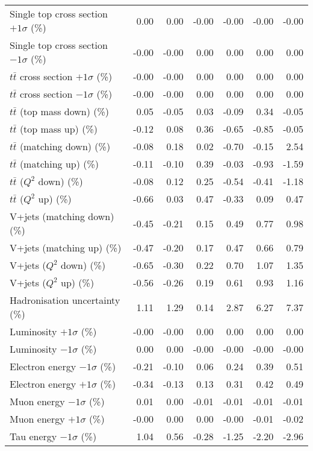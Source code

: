\begin{table}[htbp]
{\begin{tabular}{lrrrrrr}
Single top cross section $+1\sigma$ (\%) & 0.00 & 0.00 & -0.00 & -0.00 & -0.00 & -0.00 \\ 
Single top cross section $-1\sigma$ (\%) & -0.00 & -0.00 & 0.00 & 0.00 & 0.00 & 0.00 \\ 
$t\bar{t}$ cross section $+1\sigma$ (\%) & -0.00 & -0.00 & 0.00 & 0.00 & 0.00 & 0.00 \\ 
$t\bar{t}$ cross section $-1\sigma$ (\%) & -0.00 & -0.00 & 0.00 & 0.00 & 0.00 & 0.00 \\ 
$t\bar{t}$ (top mass down) (\%) & 0.05 & -0.05 & 0.03 & -0.09 & 0.34 & -0.05 \\ 
$t\bar{t}$ (top mass up) (\%) & -0.12 & 0.08 & 0.36 & -0.65 & -0.85 & -0.05 \\ 
$t\bar{t}$ (matching down) (\%) & -0.08 & 0.18 & 0.02 & -0.70 & -0.15 & 2.54 \\ 
$t\bar{t}$ (matching up) (\%) & -0.11 & -0.10 & 0.39 & -0.03 & -0.93 & -1.59 \\ 
$t\bar{t}$ ($Q^{2}$ down) (\%) & -0.08 & 0.12 & 0.25 & -0.54 & -0.41 & -1.18 \\ 
$t\bar{t}$ ($Q^{2}$ up) (\%) & -0.66 & 0.03 & 0.47 & -0.33 & 0.09 & 0.47 \\ 
V+jets (matching down) (\%) & -0.45 & -0.21 & 0.15 & 0.49 & 0.77 & 0.98 \\ 
V+jets (matching up) (\%) & -0.47 & -0.20 & 0.17 & 0.47 & 0.66 & 0.79 \\ 
V+jets ($Q^{2}$ down) (\%) & -0.65 & -0.30 & 0.22 & 0.70 & 1.07 & 1.35 \\ 
V+jets ($Q^{2}$ up) (\%) & -0.56 & -0.26 & 0.19 & 0.61 & 0.93 & 1.16 \\ 
Hadronisation uncertainty (\%) & 1.11 & 1.29 & 0.14 & 2.87 & 6.27 & 7.37 \\ 
Luminosity $+1\sigma$ (\%) & -0.00 & -0.00 & 0.00 & 0.00 & 0.00 & 0.00 \\ 
Luminosity $-1\sigma$ (\%) & 0.00 & 0.00 & -0.00 & -0.00 & -0.00 & -0.00 \\ 
Electron energy $-1\sigma$ (\%) & -0.21 & -0.10 & 0.06 & 0.24 & 0.39 & 0.51 \\ 
Electron energy $+1\sigma$ (\%) & -0.34 & -0.13 & 0.13 & 0.31 & 0.42 & 0.49 \\ 
Muon energy $-1\sigma$ (\%) & 0.01 & 0.00 & -0.01 & -0.01 & -0.01 & -0.01 \\ 
Muon energy $+1\sigma$ (\%) & -0.00 & 0.00 & 0.00 & -0.00 & -0.01 & -0.02 \\ 
Tau energy $-1\sigma$ (\%) & 1.04 & 0.56 & -0.28 & -1.25 & -2.20 & -2.96 \\ 

\end{tabular}}
\end{table}
